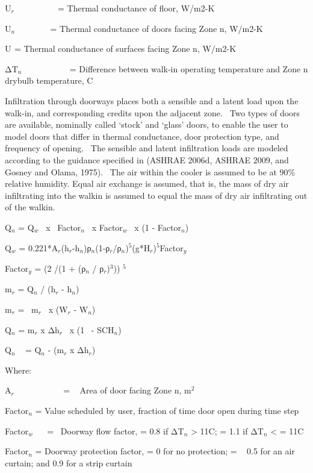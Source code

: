 U\(_{r}\) ~~~~~~~~~ = Thermal conductance of floor, W/m2-K

U\(_{n}\) ~~~~~~~ = Thermal conductance of doors facing Zone n, W/m2-K

U\(_{ }\) = Thermal conductance of surfaces facing Zone n, W/m2-K

ΔT\(_{n}\) ~~~~~~~~~~ = Difference between walk-in operating temperature and Zone n drybulb temperature, C

Infiltration through doorways places both a sensible and a latent load upon the walk-in, and corresponding credits upon the adjacent zone.~ Two types of doors are available, nominally called `stock' and `glass' doors, to enable the user to model doors that differ in thermal conductance, door protection type, and frequency of opening.~ The sensible and latent infiltration loads are modeled according to the guidance specified in (ASHRAE 2006d, ASHRAE 2009, and Gosney and Olama, 1975).~ The air within the cooler is assumed to be at 90\% relative humidity. Equal air exchange is assumed, that is, the mass of dry air infiltrating into the walkin is assumed to equal the mass of dry air infiltrating out of the walkin.

Q\(_{n}\) = Q\(_{w}\) ~x~ Factor\(_{n}\) ~x Factor\(_{w}\) ~x (1 - Factor\(_{n}\))

Q\(_{w}\) = 0.221*A\(_{r}\)(h\(_{r}\)-h\(_{n}\))ρ\(_{n}\)(1-ρ\(_{r}\)/ρ\(_{n}\))\(^{5}\)(g*H\(_{r}\))\(^{5}\)Factor\(_{y}\)

Factor\(_{y}\) = (2 /(1 + (ρ\(_{n}\) / ρ\(_{r}\))\(^{3}\))) \(^{5}\)

m\(_{r}\) = Q\(_{n}\) / (h\(_{r}\) - h\(_{n}\))

m\(_{r}\) = ~m\(_{r}\) ~x (W\(_{r}\) - W\(_{n}\))

Q\(_{n}\) = m\(_{r}\) x Δh\(_{r}\) ~x (1 ~- SCH\(_{n}\))

Q\(_{n}\) ~ = Q\(_{n}\) - (m\(_{r}\) x Δh\(_{r}\))

Where:

A\(_{r}\)~~~~~~~~~~~ = ~ Area of door facing Zone n, m\(^{2}\)

Factor\(_{n}\) = Value scheduled by user, fraction of time door open during time step

Factor\(_{w}\) ~~ = ~Doorway flow factor, = 0.8 if ΔT\(_{n}\) \textgreater{} 11C; = 1.1 if ΔT\(_{n}\) \textless{} = 11C

Factor\(_{n}\) = Doorway protection factor, = 0 for no protection; = ~ 0.5 for an air curtain; and 0.9 for a strip curtain

